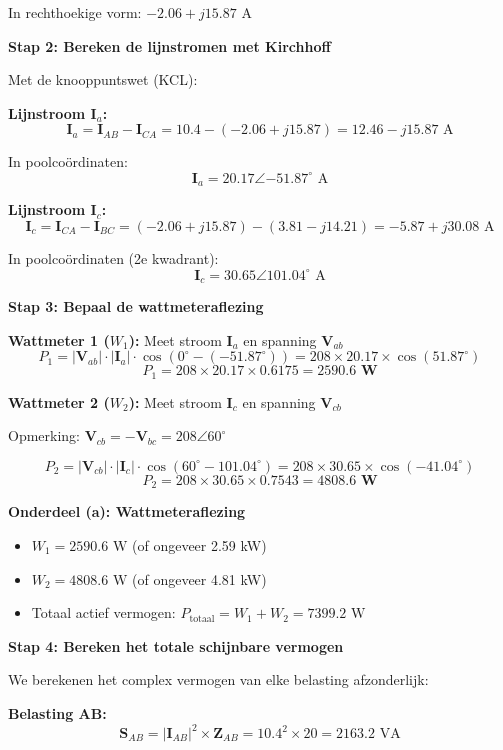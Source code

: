 \documentclass[a4paper,11pt]{article}
\begin{document}
\begin{oefenblok}
In rechthoekige vorm: $-2.06 + j15.87 \text{ A}$

\textbf{Stap 2: Bereken de lijnstromen met Kirchhoff}

Met de knooppuntswet (KCL):

\textbf{Lijnstroom $\mathbf{I}_a$:}
$$\mathbf{I}_a = \mathbf{I}_{AB} - \mathbf{I}_{CA} = 10.4 - (-2.06 + j15.87) = 12.46 - j15.87 \text{ A}$$

In poolcoördinaten:
$$\mathbf{I}_a = 20.17\angle{-51.87^\circ} \text{ A}$$

\textbf{Lijnstroom $\mathbf{I}_c$:}
$$\mathbf{I}_c = \mathbf{I}_{CA} - \mathbf{I}_{BC} = (-2.06 + j15.87) - (3.81 - j14.21) = -5.87 + j30.08 \text{ A}$$

In poolcoördinaten (2e kwadrant):
$$\mathbf{I}_c = 30.65\angle{101.04^\circ} \text{ A}$$

\textbf{Stap 3: Bepaal de wattmeteraflezing}

\textbf{Wattmeter 1 ($W_1$):} Meet stroom $\mathbf{I}_a$ en spanning $\mathbf{V}_{ab}$
$$P_1 = |\mathbf{V}_{ab}| \cdot |\mathbf{I}_a| \cdot \cos(0^\circ - (-51.87^\circ)) = 208 \times 20.17 \times \cos(51.87^\circ)$$
$$\boxed{P_1 = 208 \times 20.17 \times 0.6175 = \mathbf{2590.6 \text{ W}}}$$

\textbf{Wattmeter 2 ($W_2$):} Meet stroom $\mathbf{I}_c$ en spanning $\mathbf{V}_{cb}$

Opmerking: $\mathbf{V}_{cb} = -\mathbf{V}_{bc} = 208\angle{60^\circ}$

$$P_2 = |\mathbf{V}_{cb}| \cdot |\mathbf{I}_c| \cdot \cos(60^\circ - 101.04^\circ) = 208 \times 30.65 \times \cos(-41.04^\circ)$$
$$\boxed{P_2 = 208 \times 30.65 \times 0.7543 = \mathbf{4808.6 \text{ W}}}$$

\textbf{Onderdeel (a): Wattmeteraflezing}
\begin{itemize}
    \item $W_1 = 2590.6 \text{ W}$ (of ongeveer 2.59 kW)
    \item $W_2 = 4808.6 \text{ W}$ (of ongeveer 4.81 kW)
    \item Totaal actief vermogen: $P_{\text{totaal}} = W_1 + W_2 = 7399.2 \text{ W}$
\end{itemize}

\textbf{Stap 4: Bereken het totale schijnbare vermogen}

We berekenen het complex vermogen van elke belasting afzonderlijk:

\textbf{Belasting AB:}
$$\boxed{\mathbf{S}_{AB} = |\mathbf{I}_{AB}|^2 \times \mathbf{Z}_{AB} = 10.4^2 \times 20 = 2163.2 \text{ VA}}$$


\end{oefenblok}
\end{document}
